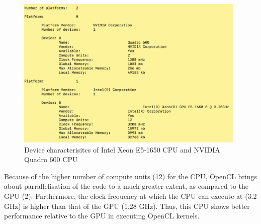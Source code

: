 \begin{figure}[h!]
\centering
\includegraphics[width=11cm]{figures/Devquery.png}
\caption{Device characterisitcs of Intel Xeon E5-1650 CPU and NVIDIA Quadro 600 CPU}
\label{fig:cnn17}
\end{figure}

Because of the higher number of compute units (12) for the CPU, OpenCL brings about parrallelisation of the code to a much greater extent, as compared to the GPU (2). Furthermore, the clock frequency at which the CPU can execute at (3.2 GHz) is higher than that of  the GPU (1.28 GHz). Thus, this CPU shows better performance relative to the GPU in executing OpenCL kernels.